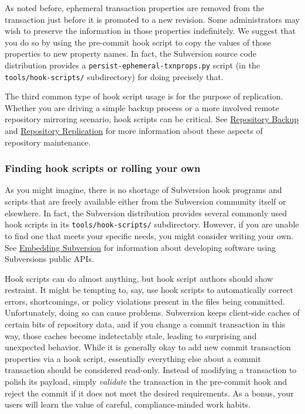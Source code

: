 As noted before, ephemeral transaction properties are removed from the
transaction just before it is promoted to a new revision. Some
administrators may wish to preserve the information in those properties
indefinitely. We suggest that you do so by using the pre-commit hook
script to copy the values of those properties to new property names. In
fact, the Subversion source code distribution provides a
\texttt{persist-ephemeral-txnprops.py} script (in the
\texttt{tools/hook-scripts/} subdirectory) for doing precisely that.

The third common type of hook script usage is for the purpose of
replication. Whether you are driving a simple backup process or a more
involved remote repository mirroring scenario, hook scripts can be
critical. See \hyperref[svn.reposadmin.maint.backup]{Repository Backup}
and \hyperref[svn.reposadmin.maint.replication]{Repository Replication}
for more information about these aspects of repository maintenance.

\subsubsection{Finding hook scripts or rolling your
own}\label{svn.reposadmin.hooks.summary}

As you might imagine, there is no shortage of Subversion hook programs
and scripts that are freely available either from the Subversion
community itself or elsewhere. In fact, the Subversion distribution
provides several commonly used hook scripts in its
\texttt{tools/hook-scripts/} subdirectory. However, if you are unable to
find one that meets your specific needs, you might consider writing your
own. See \hyperref[svn.developer]{Embedding Subversion} for information
about developing software using Subversion\textquotesingle s public
APIs.

Hook scripts can do almost anything, but hook script authors should show
restraint. It might be tempting to, say, use hook scripts to
automatically correct errors, shortcomings, or policy violations present
in the files being committed. Unfortunately, doing so can cause
problems. Subversion keeps client-side caches of certain bits of
repository data, and if you change a commit transaction in this way,
those caches become indetectably stale, leading to surprising and
unexpected behavior. While it is generally okay to add new commit
transaction properties via a hook script, essentially everything else
about a commit transaction should be considered read-only. Instead of
modifying a transaction to polish its payload, simply \emph{validate}
the transaction in the pre-commit hook and reject the commit if it does
not meet the desired requirements. As a bonus, your users will learn the
value of careful, compliance-minded work habits.

